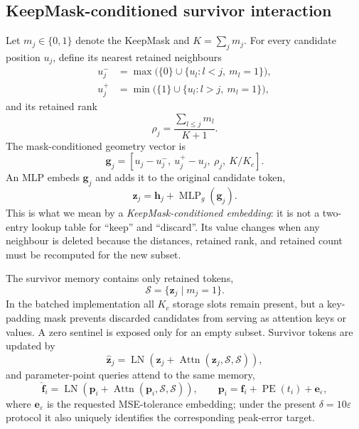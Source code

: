 \documentclass[preprint,12pt]{elsarticle}
\begin{document}
\subsection{KeepMask-conditioned survivor interaction}
Let $m_j\in\{0,1\}$ denote the KeepMask and
$K=\sum_jm_j$. For every candidate position $u_j$, define its nearest retained
neighbours
\begin{align}
u_j^-&=\max\bigl(\{0\}\cup\{u_l:l<j,\ m_l=1\}\bigr),\\
u_j^+&=\min\bigl(\{1\}\cup\{u_l:l>j,\ m_l=1\}\bigr),
\end{align}
and its retained rank
\begin{equation}
\rho_j=\frac{\sum_{l\leq j}m_l}{K+1}.
\end{equation}
The mask-conditioned geometry vector is
\begin{equation}
\bm g_j=\left[u_j-u_j^-,\ u_j^+-u_j,\ \rho_j,\ K/K_c\right].
\label{eq:keep-geometry}
\end{equation}
An MLP embeds $\bm g_j$ and adds it to the original candidate token,
\begin{equation}
\bm z_j=\bm h_j+\operatorname{MLP}_{g}(\bm g_j).
\end{equation}
This is what we mean by a \emph{KeepMask-conditioned embedding}: it is not a
two-entry lookup table for ``keep'' and ``discard''. Its value changes when any
neighbour is deleted because the distances, retained rank, and retained count
must be recomputed for the new subset.

The survivor memory contains only retained tokens,
\begin{equation}
\mathcal S=\{\bm z_j\mid m_j=1\}.
\end{equation}
In the batched implementation all $K_c$ storage slots remain present, but a
key-padding mask prevents discarded candidates from serving as attention keys
or values. A zero sentinel is exposed only for an empty subset. Survivor tokens
are updated by
\begin{equation}
\widehat{\bm z}_j=\operatorname{LN}\left(
\bm z_j+\operatorname{Attn}(\bm z_j,\mathcal S,\mathcal S)\right),
\end{equation}
and parameter-point queries attend to the same memory,
\begin{equation}
\widehat{\bm f}_i=\operatorname{LN}\left(
\bm p_i+\operatorname{Attn}(\bm p_i,\mathcal S,\mathcal S)\right),
\qquad
\bm p_i=\bm f_i+\operatorname{PE}(t_i)+\bm e_{\varepsilon},
\end{equation}
where $\bm e_{\varepsilon}$ is the requested MSE-tolerance embedding; under
the present $\delta=10\varepsilon$ protocol it also uniquely identifies the
corresponding peak-error target.
\end{document}
